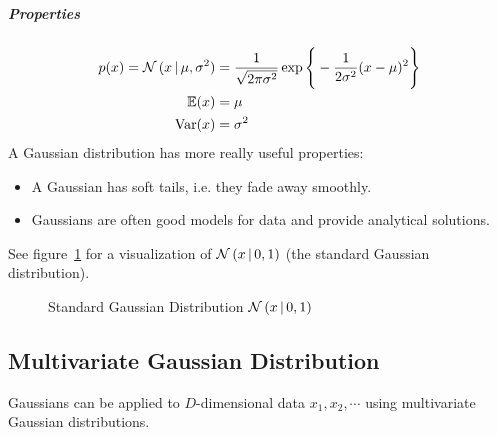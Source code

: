 				\subparagraph{Properties}
					\begin{align}
						p(x) = \mathcal{N}\,(x \,\vert\, \mu, \sigma^2) & = \frac{1}{\sqrt{2\pi\sigma^2}} \exp\Bigg\{ -\frac{1}{2\sigma^2} (x - \mu)^2 \Bigg\} \\
						\mathbb{E}(x)                                        & = \mu                                                                                \\
						\operatorname{Var}(x)                                      & = \sigma^2
					\end{align}
					A Gaussian distribution has more really useful properties:
					\begin{itemize}
						\item A Gaussian has soft tails, i.e. they fade away smoothly.
						\item Gaussians are often good models for data and provide analytical solutions.
					\end{itemize}

					See figure~\ref{fig:gaussianDistribution} for a visualization of \( \mathcal{N}\,(x \,\vert\, 0, 1) \) (the standard Gaussian distribution).

					\begin{figure}
						\centering
						\caption{Standard Gaussian Distribution \( \mathcal{N}\,(x \,\vert\, 0, 1) \)}
						\label{fig:gaussianDistribution}
					\end{figure}

		\subsection{Multivariate Gaussian Distribution}
			Gaussians can be applied to \(D\)-dimensional data \(x_1, x_2, \cdots\) using multivariate Gaussian distributions.

